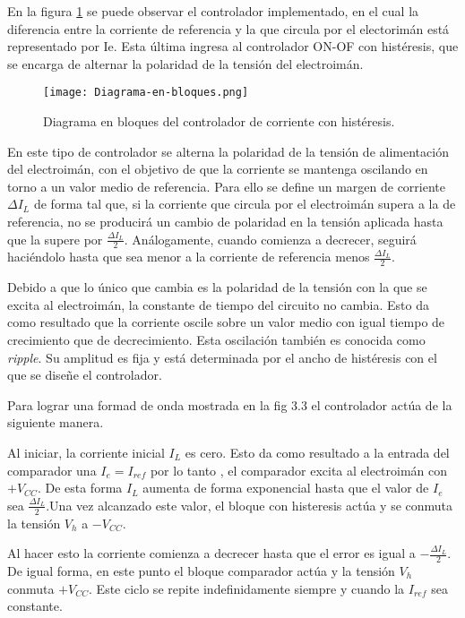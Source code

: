 En la figura \ref{fig:img_diag-en-bloques} se puede observar el controlador implementado, en el cual la diferencia entre la corriente de referencia y la que circula por el electorimán está representado por Ie. Esta última ingresa al controlador ON-OF con histéresis, que se encarga de alternar la polaridad de la tensión del electroimán.


\begin{figure}[H]
	\centering
	\texttt{[image: Diagrama-en-bloques.png]}
	\caption{Diagrama en bloques del controlador de corriente con histéresis.}
	\label{fig:img_diag-en-bloques}
\end{figure}

En este tipo de controlador se alterna la polaridad de la tensión de alimentación del electroimán, con el objetivo de que la corriente se mantenga oscilando en torno a un valor medio de referencia. Para ello se define un margen de corriente $\Delta I_L$ de forma tal que, si la corriente que circula por el electroimán supera a la de referencia, no se producirá un cambio de polaridad en la tensión aplicada hasta que la supere por $\frac{\Delta I_L}{2}$. Análogamente, cuando comienza a decrecer, seguirá haciéndolo hasta que sea menor a la corriente de referencia menos $\frac{\Delta I_L}{2}$.

Debido a que lo único que cambia es la polaridad de la tensión con la que se excita al electroimán, la constante de tiempo del circuito no cambia. Esto da como resultado que la corriente oscile sobre un valor medio con igual tiempo de crecimiento que de decrecimiento. Esta oscilación también es conocida como \textsl{ripple}. Su amplitud es fija y está determinada por el ancho de histéresis con el que se diseñe el controlador.

Para lograr una formad de onda mostrada en la  fig 3.3 el controlador actúa de la siguiente manera. 

Al iniciar, la corriente inicial $I_L$ es cero. Esto da como resultado a la entrada del comparador una $I_e = I_{ref}$ por lo tanto , el comparador excita al electroimán con $+V_{CC}$. De esta forma $I_L$ aumenta de forma exponencial hasta que el valor de $I_e$ sea $\frac{\Delta I_L}{2}$.Una vez alcanzado este valor, el bloque con histeresis actúa y se conmuta la tensión $V_h$ a $-V_{CC}$.

Al hacer esto la corriente comienza a decrecer hasta que el error es igual a $-\frac{\Delta I_L}{2}$. De igual forma, en este punto el bloque comparador actúa y la tensión $V_h$ conmuta $+V_{CC}$. Este ciclo se repite indefinidamente siempre y cuando la $I_{ref}$ sea constante.


